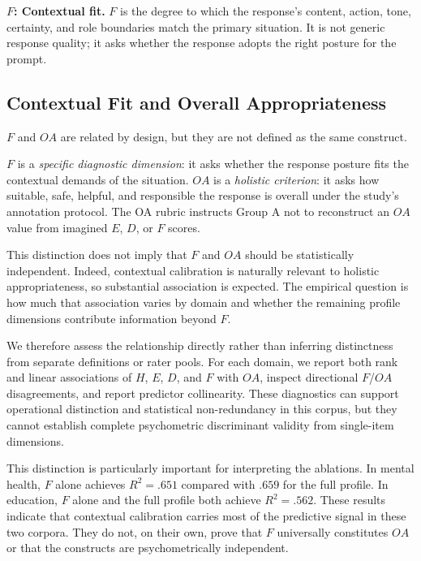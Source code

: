 \documentclass[manuscript,review,anonymous]{acmart}
\begin{document}
\textbf{$F$: Contextual fit.} $F$ is the degree to which the response's content, action, tone, certainty, and role boundaries match the primary situation. It is not generic response quality; it asks whether the response adopts the right posture for the prompt.

\subsection{Contextual Fit and Overall Appropriateness}

$F$ and $OA$ are related by design, but they are not defined as the same construct.

$F$ is a \emph{specific diagnostic dimension}: it asks whether the response posture fits the contextual demands of the situation. $OA$ is a \emph{holistic criterion}: it asks how suitable, safe, helpful, and responsible the response is overall under the study's annotation protocol. The OA rubric instructs Group A not to reconstruct an $OA$ value from imagined $E$, $D$, or $F$ scores.

This distinction does not imply that $F$ and $OA$ should be statistically independent. Indeed, contextual calibration is naturally relevant to holistic appropriateness, so substantial association is expected. The empirical question is how much that association varies by domain and whether the remaining profile dimensions contribute information beyond $F$.

We therefore assess the relationship directly rather than inferring distinctness from separate definitions or rater pools. For each domain, we report both rank and linear associations of $H$, $E$, $D$, and $F$ with $OA$, inspect directional $F$/$OA$ disagreements, and report predictor collinearity. These diagnostics can support operational distinction and statistical non-redundancy in this corpus, but they cannot establish complete psychometric discriminant validity from single-item dimensions.

This distinction is particularly important for interpreting the ablations. In mental health, $F$ alone achieves $R^2=.651$ compared with $.659$ for the full profile. In education, $F$ alone and the full profile both achieve $R^2=.562$. These results indicate that contextual calibration carries most of the predictive signal in these two corpora. They do not, on their own, prove that $F$ universally constitutes $OA$ or that the constructs are psychometrically independent.
\end{document}
